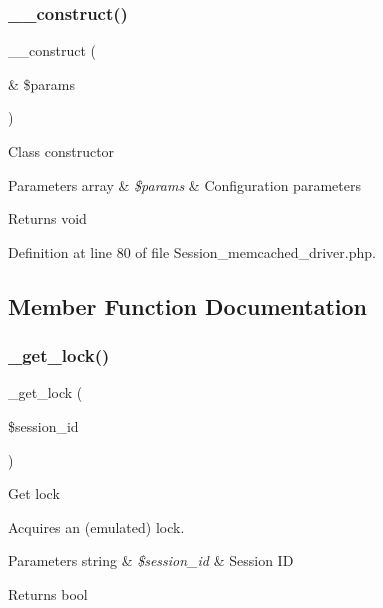 \subsubsection{\texorpdfstring{\_\_construct()}{\_\_construct()}}
{\footnotesize\ttfamily \+\_\+\+\_\+construct (\begin{DoxyParamCaption}\item[{\&}]{\$params }\end{DoxyParamCaption})}

Class constructor


\begin{DoxyParams}[1]{Parameters}
array & {\em \$params} & Configuration parameters \\
\hline
\end{DoxyParams}
\begin{DoxyReturn}{Returns}
void 
\end{DoxyReturn}


Definition at line 80 of file Session\+\_\+memcached\+\_\+driver.\+php.



\subsection{Member Function Documentation}
\mbox{\label{class_c_i___session__memcached__driver_a2c49c8e23be3e2aca96a9d20de18ffc2}} 
\subsubsection{\texorpdfstring{\_get\_lock()}{\_get\_lock()}}
{\footnotesize\ttfamily \+\_\+get\+\_\+lock (\begin{DoxyParamCaption}\item[{}]{\$session\+\_\+id }\end{DoxyParamCaption})\hspace{0.3cm}{\ttfamily [protected]}}

Get lock

Acquires an (emulated) lock.


\begin{DoxyParams}[1]{Parameters}
string & {\em \$session\+\_\+id} & Session ID \\
\hline
\end{DoxyParams}
\begin{DoxyReturn}{Returns}
bool 
\end{DoxyReturn}


